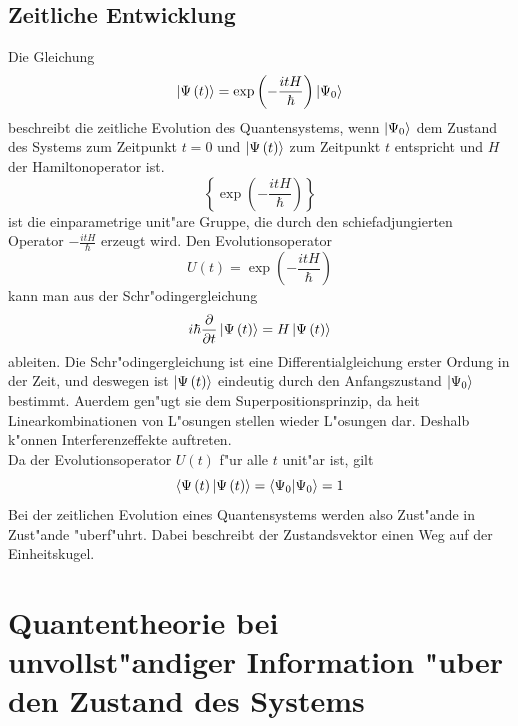     \subsection{Zeitliche Entwicklung}
        Die Gleichung
        $$ \left| \Psi\left( t\right) \right> = \exp\left( -\frac{itH}{\hbar}\right) \left| \Psi_0 \right> $$
        beschreibt die zeitliche Evolution des Quantensystems, wenn $\left| \Psi_0 \right>$ dem Zustand des Systems zum Zeitpunkt $t=0$ und $\left| \Psi\left( t\right) \right>$
        zum Zeitpunkt $t$ entspricht und $H$ der Hamiltonoperator ist. 
        $$ \left\{ \exp\left( -\frac{itH}{\hbar}\right)\right\} $$
        ist die einparametrige unit"are Gruppe, die durch den schiefadjungierten Operator $ -\frac{itH}{\hbar}$ erzeugt wird. Den Evolutionsoperator
        $$ U\left( t\right) = \exp\left( -\frac{itH}{\hbar}\right) $$
        kann man aus der Schr"odingergleichung 
        $$ i\hbar {\partial \over \partial t} \left| \Psi\left( t\right) \right> = H\left| \Psi\left( t\right) \right> $$
        ableiten. Die Schr"odingergleichung ist eine Differentialgleichung erster Ordung in der Zeit, und deswegen ist $\left| \Psi\left( t\right) \right>$ eindeutig durch den
        Anfangszustand $\left| \Psi_0 \right>$ bestimmt. Au\3erdem gen"ugt sie dem Superpositionsprinzip, da\3 hei\3t Linearkombinationen von L"osungen stellen wieder
        L"osungen dar. Deshalb k"onnen Interferenzeffekte auftreten. \\
        Da der Evolutionsoperator $U\left( t\right)$ f"ur alle $t$ unit"ar ist, gilt
        $$ \left< \Psi\left( t\right) | \Psi\left( t\right) \right> = \left< \Psi_0 | \Psi_0 \right> = 1 $$
        Bei der zeitlichen Evolution eines Quantensystems werden also Zust"ande in Zust"ande "uberf"uhrt. Dabei beschreibt der Zustandsvektor einen Weg auf der Einheitskugel. 
    
 
\section{Quantentheorie bei unvollst"andiger Information "uber den Zustand des Systems}
